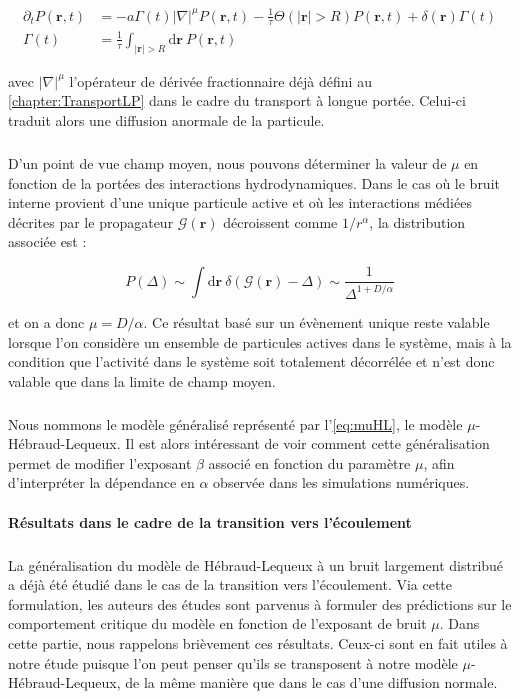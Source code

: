 \begin{equation}
\begin{aligned}
    \partial_t P(\mathbf{r}, t) &= -a\Gamma (t)|\nabla|^{\mu} P(\mathbf{r}, t) - \frac{1}{\tau}\Theta(|\mathbf{r}|>R)P(\mathbf{r}, t) + \delta(\mathbf{r})\Gamma (t)\\
     \Gamma (t) &= \frac{1}{\tau}\int_{|\mathbf{r}|>R}\mathrm{d}\mathbf{r}~P(\mathbf{r}, t)
\end{aligned}
    \label{eq:muHL}
\end{equation}

\noindent avec $|\nabla|^{\mu}$ l'opérateur de dérivée fractionnaire déjà défini au \autoref{chapter:TransportLP} dans le cadre du transport à longue portée. Celui-ci traduit alors une diffusion anormale de la particule.

\subparagraph{}D'un point de vue champ moyen, nous pouvons déterminer la valeur de $\mu$ en fonction de la portées des interactions hydrodynamiques. Dans le cas où le bruit interne provient d'une unique particule active et où les interactions médiées décrites par le propagateur $\mathcal{G}(\mathbf{r})$ décroissent comme $1/r^\alpha$, la distribution associée est :

\begin{equation}
	P(\Delta) \sim \int \mathrm{d}\mathbf{r}~\delta\left( \mathcal{G}(\mathbf{r})-\Delta \right)\sim \frac{1}{\Delta^{1+D/\alpha}}
\end{equation}

\noindent et on a donc $\mu = D/\alpha$. Ce résultat basé sur un évènement unique reste valable lorsque l'on considère un ensemble de particules actives dans le système, mais à la condition que l'activité dans le système soit totalement décorrélée et n'est donc valable que dans la limite de champ moyen.

\subparagraph{}Nous nommons le modèle généralisé représenté par l'\autoref{eq:muHL}, le modèle $\mu$-Hébraud-Lequeux. Il est alors intéressant de voir comment cette généralisation permet de modifier l'exposant $\beta$ associé en fonction du paramètre $\mu$, afin d'interpréter la dépendance en $\alpha$ observée dans les simulations numériques.

\paragraph{Résultats dans le cadre de la transition vers l'écoulement}

\subparagraph{}La généralisation du modèle de Hébraud-Lequeux à un bruit largement distribué a déjà été étudié dans le cas de la transition vers l'écoulement. Via cette formulation, les auteurs des études \cite{lin_mean-field_2016, lin_microscopic_2018} sont parvenus à formuler des prédictions sur le comportement critique du modèle en fonction de l'exposant de bruit $\mu$. Dans cette partie, nous rappelons brièvement ces résultats. Ceux-ci sont en fait utiles à notre étude puisque l'on peut penser qu'ils se transposent à notre modèle $\mu$-Hébraud-Lequeux, de la même manière que dans le cas d'une diffusion normale.


